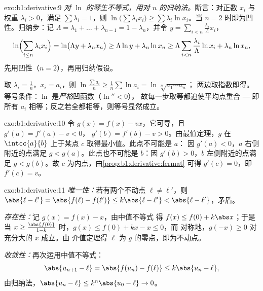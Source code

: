 \begin{solution}{exo:b1:derivative:9}
\emph{对 $\ln$ 的琴生不等式，用对 $n$ 的归纳法。}断言：对正数
$x_i$ 与权重 $\lambda_i > 0$，满足 $\sum \lambda_i = 1$，则
$\ln\bigl(\sum \lambda_i x_i\bigr) \geq \sum \lambda_i \ln x_i$。当
$n = 2$ 时即为凹性。归纳步：记 $\Lambda = \lambda_1 + \dots +
\lambda_{n-1} = 1 - \lambda_n$，并令 $y = \sum_{i<n}
\frac{\lambda_i}{\Lambda} x_i$，
\[
\ln\Bigl(\sum_{i \leq n} \lambda_i x_i\Bigr)
= \ln\bigl(\Lambda y + \lambda_n x_n\bigr)
\geq \Lambda \ln y + \lambda_n \ln x_n
\geq \Lambda \sum_{i<n} \frac{\lambda_i}{\Lambda}\ln x_i
+ \lambda_n \ln x_n,
\]
先用凹性（$n = 2$），再用归纳假设。

取 $\lambda_i = \frac 1n$，$x_i = a_i$，则 $\ln\frac{\sum a_i}{n}
\geq \frac 1n \sum \ln a_i = \ln\sqrt[n]{a_1\cdots a_n}$；
两边取指数即得。等号条件：$\ln$ 是\emph{严格}凹函数（$\ln'' < 0$），
故每一步取等都迫使平均点重合 ---
即所有 $a_i$ 相等；反之若全都相等，则等号显然成立。
\end{solution}

\begin{solution}{exo:b1:derivative:10}
令 $g(x) = f(x) - vx$，它可导，且 $g'(a) = f'(a) - v < 0$，
$g'(b) = f'(b) - v > 0$。由最值定理，$g$
在 $\intcc{a}{b}$ 上于某点 $c$ 取得最小值。此点不可能是 $a$：
因 $g'(a) < 0$，$a$ 右侧附近的点满足 $g < g(a)$。此点也不可能是
$b$：因 $g'(b) > 0$，$b$ 左侧附近的点满足 $g <
g(b)$。故 $c$ 为内点，由\cref{prop:b1:derivative:fermat}
可得 $g'(c) = 0$，即 $f'(c) = v$。
\end{solution}

\begin{solution}{exo:b1:derivative:11}
\emph{唯一性：}若有两个不动点 $\ell \neq \ell'$，则
$\abs{\ell - \ell'} = \abs{f(\ell) - f(\ell')} \leq k\abs{\ell -
\ell'} < \abs{\ell - \ell'}$，矛盾。

\emph{存在性：}记 $g(x) = f(x) - x$，由中值不等式
得 $f(x) \leq f(0) + k\abs x$；于是当 $x \geq
\frac{\abs{f(0)}}{1 - k}$ 时，$g(x) \leq f(0) + kx - x \leq 0$，而
对称地，$g(-x) \geq 0$ 对充分大的 $x$ 成立。由
介值定理得 $\ell$ 为 $g$ 的零点，即为不动点。

\emph{收敛性：}再次运用中值不等式：
\[
\abs{u_{n+1} - \ell} = \abs{f(u_n) - f(\ell)} \leq k\abs{u_n - \ell},
\]
由归纳法，$\abs{u_n - \ell} \leq k^n \abs{u_0 - \ell} \to 0$。
\end{solution}


